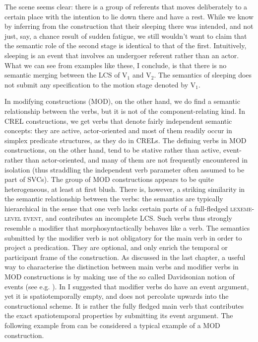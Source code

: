 The scene seems clear: there is a group of referents that moves deliberately to a certain place with the intention to lie down there and have a rest. While we know by inferring from the construction that their sleeping there was intended, and not just, say, a chance result of sudden fatigue, we still wouldn't want to claim that the semantic role of the second stage is identical to that of the first. Intuitively, sleeping is an event that involves an undergoer referent rather than an actor. What we can see from examples like these, I conclude, is that there is no semantic merging between the LCS of V$_1$ and V$_2$. The semantics of sleeping does not submit any specification to the motion stage denoted by V$_1$.

In modifying constructions (MOD), on the other hand, we do find a semantic relationship between the verbs, but it is not of the component-relating kind. In CREL constructions, we get verbs that denote fairly independent semantic concepts: they are active, actor-oriented and most of them readily occur in simplex predicate structures, as they do in CRELs. The defining verbs in MOD constructions, on the other hand, tend to be stative rather than active, event- rather than actor-oriented, and many of them are not frequently encountered in isolation (thus straddling the independent verb parameter often assumed to be part of SVCs). The group of MOD constructions appears to be quite heterogeneous, at least at first blush. There is, however, a striking similarity in the semantic relationship between the verbs: the semantics are typically hierarchical in the sense that one verb lacks certain parts of a full-fledged \textsc{lexeme-level event}, and contributes an incomplete LCS. Such verbs thus strongly resemble a modifier that morphosyntactically behaves like a verb. The semantics submitted by the modifier verb is not obligatory for the main verb in order to project a predication. They are optional, and only enrich the temporal or participant frame of the construction. As discussed in the last chapter, a useful way to characterise the distinction between main verbs and modifier verbs in MOD constructions is by making use of the so called Davidsonian notion of events (see e.g. \citealt{maienborn2011event}). In  I suggested that modifier verbs do have an event argument, yet it is spatiotemporally empty, and does not percolate upwards into the constructional scheme. It is rather the fully fledged main verb that contributes the exact spatiotemporal properties by submitting its event argument. The following example from  can be considered a typical example of a MOD construction. 

